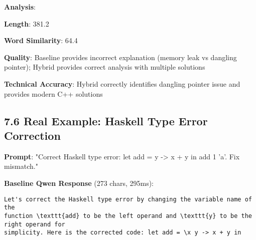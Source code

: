 \documentclass[11pt,a4paper]{article}
\begin{document}
\textbf{Analysis}:
\item \textbf{Length}: 381.2%
\item \textbf{Word Similarity}: 64.4%
\item \textbf{Quality}: Baseline provides incorrect explanation (memory leak vs dangling pointer); Hybrid provides correct analysis with multiple solutions
\item \textbf{Technical Accuracy}: Hybrid correctly identifies dangling pointer issue and provides modern C++ solutions

\subsection{7.6 Real Example: Haskell Type Error Correction}

\textbf{Prompt}: "Correct Haskell type error: let add = \x y -> x + y in add 1 'a'. Fix mismatch."

\textbf{Baseline Qwen Response} (273 chars, 295ms):
\begin{verbatim}Let's correct the Haskell type error by changing the variable name of the 
function \texttt{add} to be the left operand and \texttt{y} to be the right operand for 
simplicity. Here is the corrected code: let add = \x y -> x + y in
\end{verbatim}
\end{document}
